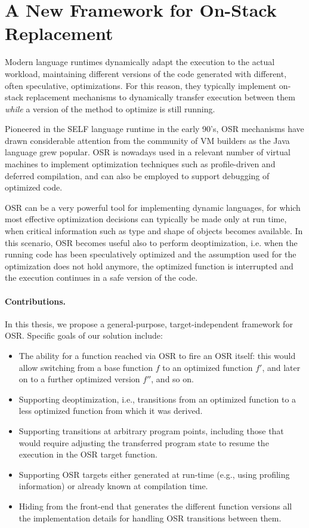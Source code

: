 \section{A New Framework for On-Stack Replacement}

Modern language runtimes dynamically adapt the execution to the actual workload, maintaining different versions of the code generated with different, often speculative, optimizations. For this reason, they typically implement on-stack replacement mechanisms to dynamically transfer execution between them {\em while} a version of the method to optimize is still running.

Pioneered in the SELF language runtime in the early 90's, OSR mechanisms have drawn considerable attention from the community of VM builders as the Java language grew popular. OSR is nowadays used in a relevant number of virtual machines to implement optimization techniques such as profile-driven and deferred compilation, and can also be employed to support debugging of optimized code.

\noindent OSR can be a very powerful tool for implementing dynamic languages, for which most effective optimization decisions can typically be made only at run time, when critical information such as type and shape of objects becomes available. In this scenario, OSR becomes useful also to perform deoptimization, i.e. when the running code has been speculatively optimized and the assumption used for the optimization does not hold anymore, the optimized function is interrupted and the execution continues in a safe version of the code.

\paragraph*{Contributions.} In this thesis, we propose a general-purpose, target-independent framework for OSR. Specific goals of our solution include:
\begin{itemize}[parsep=0pt]
\item The ability for a function reached via OSR to fire an OSR itself: this would allow switching from a base function $f$ to an optimized function $f'$, and later on to a further optimized version $f''$, and so on.
\item Supporting deoptimization, i.e., transitions from an optimized function to a less optimized function from which it was derived.
\item Supporting transitions at arbitrary program points, including those that would require adjusting the transferred program state to resume the execution in the OSR target function.
\item Supporting OSR targets either generated at run-time (e.g., using profiling information) or already known at compilation time.
\item Hiding from the front-end that generates the different function versions all the implementation details for handling OSR transitions between them.%
\end{itemize}

